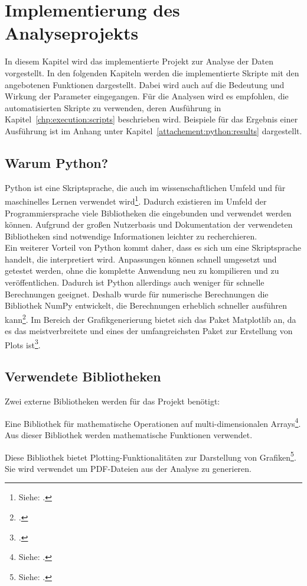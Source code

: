\chapter{Implementierung des Analyseprojekts}
\label{chp:python:implementation}
In diesem Kapitel wird das implementierte Projekt zur Analyse der Daten vorgestellt.
In den folgenden Kapiteln werden die implementierte Skripte mit den angebotenen Funktionen dargestellt. 
Dabei wird auch auf die Bedeutung und Wirkung der Parameter eingegangen.
Für die Analysen wird es empfohlen, die automatisierten Skripte zu verwenden, deren Ausführung in Kapitel~\ref{chp:execution:scripts} beschrieben wird.
Beispiele für das Ergebnis einer Ausführung ist im Anhang unter Kapitel~\ref{attachement:python:results} dargestellt.

\section{Warum Python?}
Python ist eine Skriptsprache, die auch im wissenschaftlichen Umfeld und für maschinelles Lernen verwendet wird\footnote{ Siehe: \cite{Fuxjaeger2017}.}.
Dadurch existieren im Umfeld der Programmiersprache viele Bibliotheken die eingebunden und verwendet werden können.
Aufgrund der großen Nutzerbasis und Dokumentation der verwendeten Bibliotheken sind notwendige Informationen leichter zu recherchieren.\\
Ein weiterer Vorteil von Python kommt daher, dass es sich um eine Skriptsprache handelt, die interpretiert wird.
Anpassungen können schnell umgesetzt und getestet werden, ohne die komplette Anwendung neu zu kompilieren und zu veröffentlichen.
Dadurch ist Python allerdings auch weniger für schnelle Berechnungen geeignet.
Deshalb wurde für numerische Berechnungen die Bibliothek NumPy entwickelt, die Berechnungen erheblich schneller ausführen kann\footnote{ \cite[vgl.][S.173f]{Woyand2017}.}.
Im Bereich der Grafikgenerierung bietet sich das Paket Matplotlib an, da es das meistverbreitete und eines der umfangreichsten Paket zur Erstellung von Plots ist\footnote{ \cite[vgl.][S.173f]{Rossant2013}.}.

\section{Verwendete Bibliotheken}
Zwei externe Bibliotheken werden für das Projekt benötigt:
\begin{description}[style=nextline]
	\item[NumPy] Eine Bibliothek für mathematische Operationen auf multi-dimensionalen Arrays\footnote{ Siehe: \cite{Athanasias2014}.}. Aus dieser Bibliothek werden mathematische Funktionen verwendet.
	\item[Matplotlib] Diese Bibliothek bietet Plotting-Funktionalitäten zur Darstellung von Grafiken\footnote{ Siehe: \cite{Matplotlib2019}.}. Sie wird verwendet um PDF-Dateien aus der Analyse zu generieren.
\end{description}
